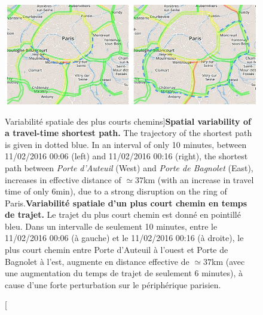 

\begin{figure}
\includegraphics[width=\linewidth]{Figures/Final/8-1-2-fig-transportationequilibrium-fig-2.jpg}
\caption[Spatial variability of shortest paths][Variabilité spatiale des plus courts chemins]{\textbf{Spatial variability of a travel-time shortest path.} The trajectory of the shortest path is given in dotted blue. In an interval of only 10 minutes, between 11/02/2016 00:06 (left) and 11/02/2016 00:16 (right), the shortest path between \emph{Porte d'Auteuil} (West) and \emph{Porte de Bagnolet} (East), increases in effective distance of $\simeq 37$km (with an increase in travel time of only 6min), due to a strong disruption on the ring of Paris.\label{fig:transportationequilibrium:fig-2}}{\textbf{Variabilité spatiale d'un plus court chemin en temps de trajet.} Le trajet du plus court chemin est donné en pointillé bleu. Dans un intervalle de seulement 10 minutes, entre le 11/02/2016 00:06 (à gauche) et le 11/02/2016 00:16 (à droite), le plus court chemin entre Porte d'Auteuil à l'ouest et Porte de Bagnolet à l'est, augmente en distance effective de $\simeq 37$km (avec une augmentation du temps de trajet de seulement 6 minutes), à cause d'une forte perturbation sur le périphérique parisien.\label{fig:transportationequilibrium:fig-2}}
\end{figure}




